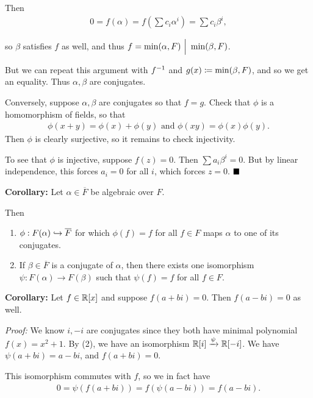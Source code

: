 Then \begin{align*}
0 = f(\alpha) = f(\sum c_i \alpha^i) = \sum c_i \beta^i
,\end{align*}

so \(\beta\) satisfies \(f\) as well, and thus
\(f = \min(\alpha, F) {~\Bigm| ~} \min(\beta, F)\).

But we can repeat this argument with \(f^{-1}\) and
\(g(x) \coloneqq \min(\beta, F)\), and so we get an equality. Thus
\(\alpha, \beta\) are conjugates.

Conversely, suppose \(\alpha, \beta\) are conjugates so that \(f = g\).
Check that \(\phi\) is a homomorphism of fields, so that
\begin{align*}
\phi(x + y) = \phi(x) + \phi(y)
\text{ and }
\phi(xy) = \phi(x) \phi(y)
.\end{align*} Then \(\phi\) is clearly surjective, so it remains to
check injectivity.

To see that \(\phi\) is injective, suppose \(f(z) = 0\). Then
\(\sum a_i \beta^i = 0\). But by linear independence, this forces
\(a_i = 0\) for all \(i\), which forces \(z=0\). \(\qed\)

\textbf{Corollary:} Let \(\alpha \in \overline F\) be algebraic over
\(F\).

Then

\begin{enumerate}
\def\labelenumi{\arabic{enumi}.}
\item
  \(\phi: F(\alpha) \hookrightarrow \overline F\) for which \(\phi(f) = f\) for
  all \(f\in F\) maps \(\alpha\) to one of its conjugates.
\item
  If \(\beta \in \overline F\) is a conjugate of \(\alpha\), then there
  exists one isomorphism \(\psi: F(\alpha) \to F(\beta)\) such that
  \(\psi(f) = f\) for all \(f\in F\).
\end{enumerate}

\textbf{Corollary:} Let \(f \in {\mathbb{R}}[x]\) and suppose \(f(a+bi) = 0\).
Then \(f(a - bi) = 0\) as well.

\emph{Proof:} We know \(i, -i\) are conjugates since they both have
minimal polynomial \(f(x) = x^2 + 1\). By (2), we have an isomorphism
\({\mathbb{R}}[i] \xrightarrow{\psi} {\mathbb{R}}[-i]\). We have \(\psi(a+bi) = a-bi\), and
\(f(a+bi) = 0\).

This isomorphism commutes with \(f\), so we in fact have
\begin{align*}
0 = \psi(f(a+bi)) = f(\psi(a-bi)) = f(a-bi)
.\end{align*}

